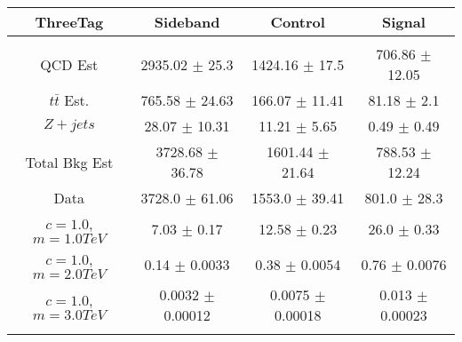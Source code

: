 \begin{footnotesize} 
\begin{tabular}{c|c|c|c} 
ThreeTag & Sideband & Control & Signal \\ 
\hline\hline 
& & & \\ 
QCD Est & 2935.02 $\pm$ 25.3 & 1424.16 $\pm$ 17.5 & 706.86 $\pm$ 12.05\\ 
$t\bar{t}$ Est.  & 765.58 $\pm$ 24.63 & 166.07 $\pm$ 11.41 & 81.18 $\pm$ 2.1\\ 
$Z+jets$ & 28.07 $\pm$ 10.31 & 11.21 $\pm$ 5.65 & 0.49 $\pm$ 0.49\\ 
Total Bkg Est & 3728.68 $\pm$ 36.78 & 1601.44 $\pm$ 21.64 & 788.53 $\pm$ 12.24\\ 
Data & 3728.0 $\pm$ 61.06 & 1553.0 $\pm$ 39.41 & 801.0 $\pm$ 28.3\\ 
$c=1.0$,$m=1.0TeV$ & 7.03 $\pm$ 0.17 & 12.58 $\pm$ 0.23 & 26.0 $\pm$ 0.33\\ 
$c=1.0$,$m=2.0TeV$ & 0.14 $\pm$ 0.0033 & 0.38 $\pm$ 0.0054 & 0.76 $\pm$ 0.0076\\ 
$c=1.0$,$m=3.0TeV$ & 0.0032 $\pm$ 0.00012 & 0.0075 $\pm$ 0.00018 & 0.013 $\pm$ 0.00023\\ 
& & & \\ 
\hline\hline 
\end{tabular} 
\end{footnotesize} 
\newline 
